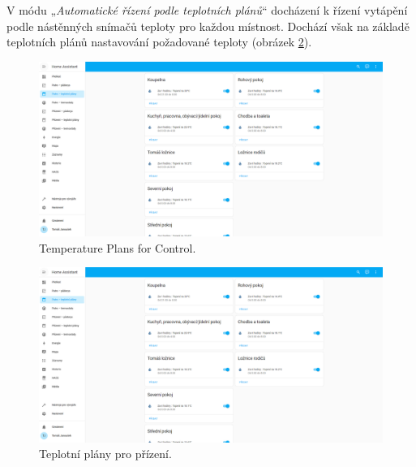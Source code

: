 \begin{Czech}
V módu „\textit{Automatické řízení podle teplotních plánů}“ docházení k řízení vytápění podle nástěnných snímačů teploty pro každou místnost. Dochází však na základě teplotních plánů nastavování požadované teploty (obrázek \ref{fig:temperature-plan-ground-floor}).
\end{Czech}


\begin{English}
\begin{figure}[H]
    \centering
    \includegraphics[width=1\textwidth]{pictures/czech/software/temperature-plan-ground-floor.png}
    \caption{Temperature Plans for Control.}
    \label{fig:temperature-plan-ground-floor}
\end{figure}
\end{English}

\begin{Czech}
\begin{figure}[H]
    \centering
    \includegraphics[width=1\textwidth]{pictures/czech/software/temperature-plan-ground-floor.png}
    \caption{Teplotní plány pro přízení.}
    \label{fig:temperature-plan-ground-floor}
\end{figure}
\end{Czech}


